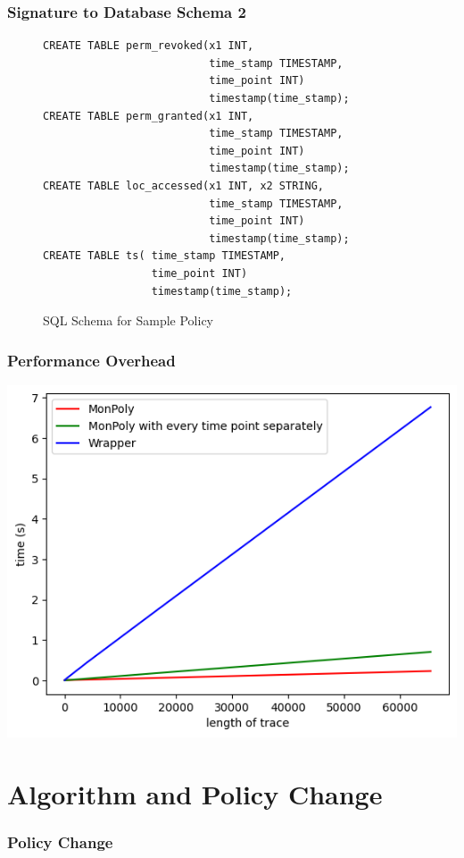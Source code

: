 \documentclass{beamer}
\begin{document}
\begin{frame}[fragile]
    \frametitle{Signature to Database Schema 2}
\begin{figure}[H]
    \label{fig:example-policy-schema}
\begin{verbatim}
CREATE TABLE perm_revoked(x1 INT,
                          time_stamp TIMESTAMP,
                          time_point INT) 
                          timestamp(time_stamp);
CREATE TABLE perm_granted(x1 INT,
                          time_stamp TIMESTAMP,
                          time_point INT) 
                          timestamp(time_stamp);
CREATE TABLE loc_accessed(x1 INT, x2 STRING,
                          time_stamp TIMESTAMP,
                          time_point INT) 
                          timestamp(time_stamp);
CREATE TABLE ts( time_stamp TIMESTAMP,
                 time_point INT) 
                 timestamp(time_stamp);
\end{verbatim}
    \caption{SQL Schema for Sample Policy}
\end{figure}
\end{frame}



\begin{frame}
    \frametitle{Performance Overhead}
    \centering
    \includegraphics[width=0.9\linewidth]{diagrams/wrapper-monpoly-total.png}
\end{frame}

\section{Algorithm and Policy Change}

\begin{frame}
    \frametitle{Policy Change}
    
\end{frame}
\end{document}
